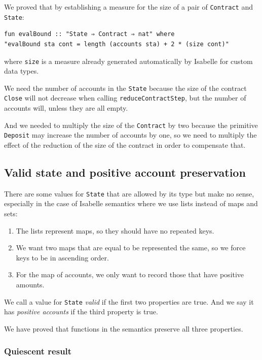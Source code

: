\documentclass[runningheads]{llncs}
\begin{document}
We proved that by establishing a measure for the size of a pair of \texttt{Contract} and \texttt{State}:

\begin{verbatim}
fun evalBound :: "State ⇒ Contract ⇒ nat" where
"evalBound sta cont = length (accounts sta) + 2 * (size cont)"
\end{verbatim}
\noindent
where \texttt{size} is a measure already generated automatically by Isabelle for custom data types.

We need the number of accounts in the \texttt{State} because the size of the contract \texttt{Close} will not decrease when calling \texttt{reduceContractStep}, but the number of accounts will, unless they are all empty.

And we needed to multiply the size of the \texttt{Contract} by two because the primitive \texttt{Deposit} may increase the number of accounts by one, so we need to multiply the effect of the reduction of the size of the contract in order to compensate that.

\subsection{Valid state and positive account preservation}

There are some values for \texttt{State} that are allowed by its type but make no sense, especially in the case of Isabelle semantics where we use lists instead of maps and sets:

\begin{enumerate}
    \item The lists represent maps, so they should have no repeated keys.
    \item We want two maps that are equal to be represented the same, so we force keys to be in ascending order.
    \item For the map of accounts, we only want to record those that have positive amounts.
\end{enumerate}
\noindent
We call a value for \texttt{State} \emph{valid} if the first two properties are true. And we say it has \emph{positive accounts} if the third property is true.

We have proved that functions in the semantics preserve all three properties.

\subsubsection{Quiescent result}
\end{document}
